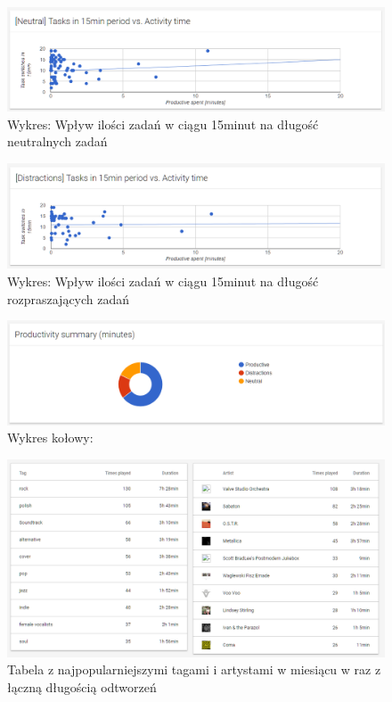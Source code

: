 \documentclass[brudnopis]{xmgr}
\begin{document}
    \begin{figure}
        \includegraphics[width=\linewidth]{fig/ui/chart-tasks-neutral.png}
        \caption{Wykres: Wpływ ilości zadań w ciągu 15minut na długość neutralnych zadań}
        \label{fig:ui:chart-tasks-neutral}
    \end{figure}

    \begin{figure}
        \includegraphics[width=\linewidth]{fig/ui/chart-tasks-distractions.png}
        \caption{Wykres: Wpływ ilości zadań w ciągu 15minut na długość rozpraszających zadań}
        \label{fig:ui:chart-tasks-distractions}
    \end{figure}

    \begin{figure}
        \includegraphics[width=\linewidth]{fig/ui/chart-productivity-summary.png}
        \caption{Wykres kołowy: }
        \label{fig:ui:chart-productivity-summary}
    \end{figure}

    \begin{figure}
        \includegraphics[width=\linewidth]{fig/ui/table-popular-music-tags.png}
        \caption{Tabela z najpopularniejszymi tagami i artystami w miesiącu w raz z łączną długością odtworzeń}
        \label{fig:ui:table-popular-music-tags}
    \end{figure}
\end{document}

